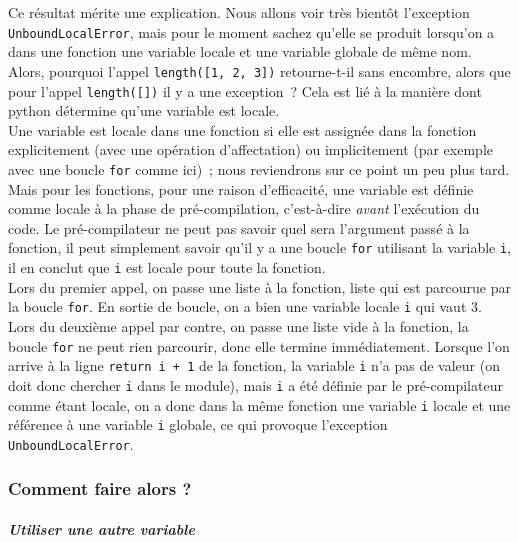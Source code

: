     Ce résultat mérite une explication. Nous allons voir très bientôt
l'exception \texttt{UnboundLocalError}, mais pour le moment sachez
qu'elle se produit lorsqu'on a dans une fonction une variable locale et
une variable globale de même nom. Alors, pourquoi l'appel
\texttt{length({[}1,\ 2,\ 3{]})} retourne-t-il sans encombre, alors que
pour l'appel \texttt{length({[}{]})} il y a une exception~? Cela est lié
à la manière dont python détermine qu'une variable est locale.\\

Une variable est locale dans une fonction si elle est assignée dans la
fonction explicitement (avec une opération d'affectation) ou
implicitement (par exemple avec une boucle \texttt{for} comme ici)~;
nous reviendrons sur ce point un peu plus tard. Mais pour les fonctions,
pour une raison d'efficacité, une variable est définie comme locale à la
phase de pré-compilation, c'est-à-dire \emph{avant} l'exécution du code.
Le pré-compilateur ne peut pas savoir quel sera l'argument passé à la
fonction, il peut simplement savoir qu'il y a une boucle \texttt{for}
utilisant la variable \texttt{i}, il en conclut que \texttt{i} est
locale pour toute la fonction.\\

Lors du premier appel, on passe une liste à la fonction, liste qui est
parcourue par la boucle \texttt{for}. En sortie de boucle, on a bien une
variable locale \texttt{i} qui vaut 3. Lors du deuxième appel par
contre, on passe une liste vide à la fonction, la boucle \texttt{for} ne
peut rien parcourir, donc elle termine immédiatement. Lorsque l'on
arrive à la ligne \texttt{return\ i\ +\ 1} de la fonction, la variable
\texttt{i} n'a pas de valeur (on doit donc chercher \texttt{i} dans le
module), mais \texttt{i} a été définie par le pré-compilateur comme
étant locale, on a donc dans la même fonction une variable \texttt{i}
locale et une référence à une variable \texttt{i} globale, ce qui
provoque l'exception \texttt{UnboundLocalError}.

    \hypertarget{comment-faire-alors}{%
\subsubsection{Comment faire alors ?}\label{comment-faire-alors}}

    \hypertarget{utiliser-une-autre-variable}{%
\subparagraph{Utiliser une autre
variable\\\\}\label{utiliser-une-autre-variable}}

